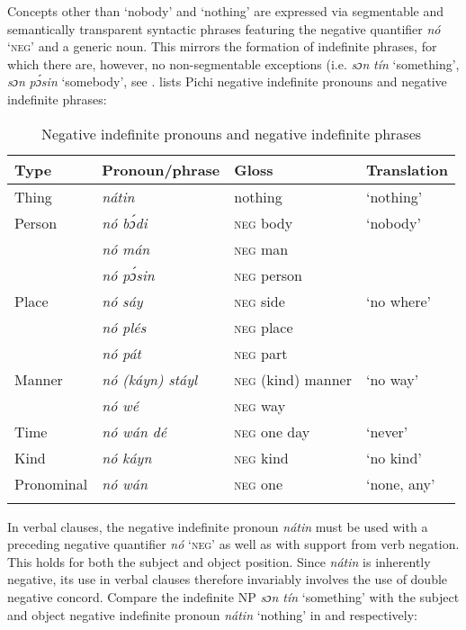 Concepts other than ‘nobody’ and ‘nothing’ are expressed via segmentable and semantically transparent syntactic phrases featuring the negative quantifier \textit{nó} ‘\textsc{neg’} and a generic noun. This mirrors the formation of indefinite phrases, for which there are, however, no non-segmentable exceptions (i.e. \textit{sɔn} \textit{tín} ‘something’, \textit{sɔn} \textit{pɔ́sin} ‘somebody’, see .  lists Pichi negative indefinite pronouns and negative indefinite phrases:


\begin{table}
\caption{Negative indefinite pronouns and negative indefinite phrases}
\label{tab:key:7.2}

\begin{tabularx}{\textwidth}{Xlll}
\lsptoprule
Type & Pronoun/phrase & Gloss & Translation\\
\midrule
Thing & \itshape nátin & nothing & ‘nothing’\\
Person & \itshape nó bɔ́di & \textsc{neg} body & ‘nobody’\\
& \itshape nó mán & \textsc{neg} man & \\
& \itshape nó pɔ́sin & \textsc{neg} person & \\
Place & \itshape nó sáy & \textsc{neg} side & ‘no where’\\
& \itshape nó plés & \textsc{neg} place & \\
& \itshape nó pát & \textsc{neg} part & \\
Manner & \itshape nó (káyn) stáyl & \textsc{neg} (kind) manner & ‘no way’\\
& \itshape nó wé & \textsc{neg} way & \\
Time & \itshape nó wán dé & \textsc{neg} one day & ‘never’\\
Kind & \itshape nó káyn & \textsc{neg} kind & ‘no kind’\\
Pronominal & \itshape nó wán & \textsc{neg} one & ‘none, any’\\
\lspbottomrule
\end{tabularx}
\end{table}
In verbal clauses, the negative indefinite pronoun \textit{nátin} must be used with a preceding negative quantifier \textit{nó} ‘\textsc{neg’} as well as with support from verb negation. This holds for both the subject and object position. Since \textit{nátin} is inherently negative, its use in verbal clauses therefore invariably involves the use of double negative concord. Compare the indefinite \textsc{NP} \textit{sɔn tín} ‘something’  with the subject and object negative indefinite pronoun \textit{nátin} ‘nothing’ in  and  respectively:


